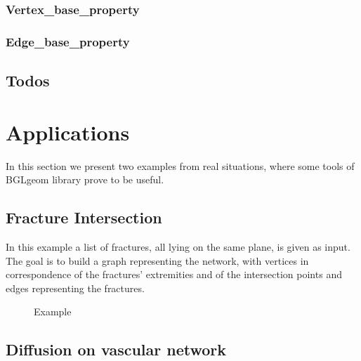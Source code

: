 \documentclass[11pt]{article} %
\begin{document}
		\subsubsection{Vertex\_base\_property}
		
		\subsubsection{Edge\_base\_property}
	
	\subsection{Todos}	%


\section{Applications}

	In this section we present two examples from real situations, where some tools of BGLgeom library prove to be useful.

	\subsection{Fracture Intersection}
		In this example a list of fractures, all lying on the same plane, is given as input. The goal is to build a graph representing the network, with vertices in correspondence of the fractures' extremities and of the intersection points  and edges representing the fractures. 
		\begin{figure}
			\centering 
			\caption{Example}
			\label{fig:frac_int}
		\end{figure}



	\subsection{Diffusion on vascular network}
\end{document}
